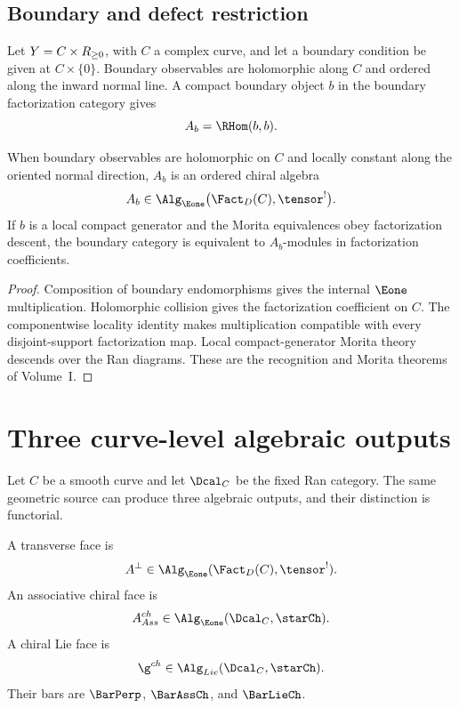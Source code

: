 \section{Boundary and defect restriction}
Let $Y=C\times R_{\ge0}$, with $C$ a complex curve, and let a boundary condition be given at $C\times\{0\}$. Boundary observables are holomorphic along $C$ and ordered along the inward normal line. A compact boundary object $b$ in the boundary factorization category gives
\[
 A_b=\RHom(b,b).
\]

\begin{theorem}
When boundary observables are holomorphic on $C$ and locally constant along the oriented normal direction, $A_b$ is an ordered chiral algebra
\[
 A_b\in\Alg_{\Eone}\bigl(\Fact_D(C),\tensor^!\bigr).
\]
If $b$ is a local compact generator and the Morita equivalences obey factorization descent, the boundary category is equivalent to $A_b$-modules in factorization coefficients.
\end{theorem}
\begin{proof}
Composition of boundary endomorphisms gives the internal $\Eone$ multiplication. Holomorphic collision gives the factorization coefficient on $C$. The componentwise locality identity makes multiplication compatible with every disjoint-support factorization map. Local compact-generator Morita theory descends over the Ran diagrams. These are the recognition and Morita theorems of Volume~I.
\end{proof}


\chapter{Three curve-level algebraic outputs}
Let $C$ be a smooth curve and let $\Dcal_C$ be the fixed Ran category.  The same geometric source can produce three algebraic outputs, and their distinction is functorial.

\begin{definition}
A transverse face is
\[
 A^\perp\in\Alg_{\Eone}(\Fact_D(C),\tensor^!).
\]
An associative chiral face is
\[
 A^{\ch}_{\mathsf{Ass}}\in\Alg_{\Eone}(\Dcal_C,\starCh).
\]
A chiral Lie face is
\[
 \g^{\ch}\in\Alg_{\mathsf{Lie}}(\Dcal_C,\starCh).
\]
Their bars are $\BarPerp$, $\BarAssCh$, and $\BarLieCh$.
\end{definition}

